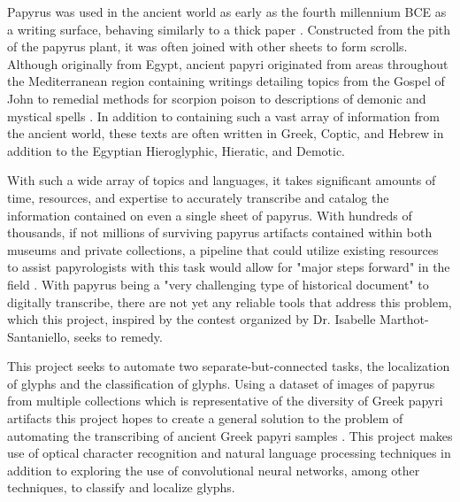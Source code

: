 Papyrus was used in the ancient world as early as the fourth millennium BCE as a writing surface, behaving similarly to a thick paper \cite{Houston}. Constructed from the pith of the papyrus plant, it was often joined with other sheets to form scrolls. Although originally from Egypt, ancient papyri originated from areas throughout the Mediterranean region containing writings detailing topics from the Gospel of John to remedial methods for scorpion poison to descriptions of demonic and mystical spells \cite{Comfort, Scorpion, Betz}. In addition to containing such a vast array of information from the ancient world, these texts are often written in Greek, Coptic, and Hebrew in addition to the Egyptian Hieroglyphic, Hieratic, and Demotic.

With such a wide array of topics and languages, it takes significant amounts of time, resources, and expertise to accurately transcribe and catalog the information contained on even a single sheet of papyrus. With hundreds of thousands, if not millions of surviving papyrus artifacts contained within both museums and private collections, a pipeline that could utilize existing resources to assist papyrologists with this task would allow for "major steps forward" in the field \cite{Contest}. With papyrus being a "very challenging type of historical document" to digitally transcribe, there are not yet any reliable tools that address this problem, which this project, inspired by the contest \cite{Contest} organized by Dr. Isabelle Marthot-Santaniello, seeks to remedy.

This project seeks to automate two separate-but-connected tasks, the localization of glyphs and the classification of glyphs. Using a dataset of images of papyrus from multiple collections which is representative of the diversity of Greek papyri artifacts this project hopes to create a general solution to the problem of automating the transcribing of ancient Greek papyri samples \cite{Contest}. This project makes use of optical character recognition and natural language processing techniques in addition to exploring the use of convolutional neural networks, among other techniques, to classify and localize glyphs.
